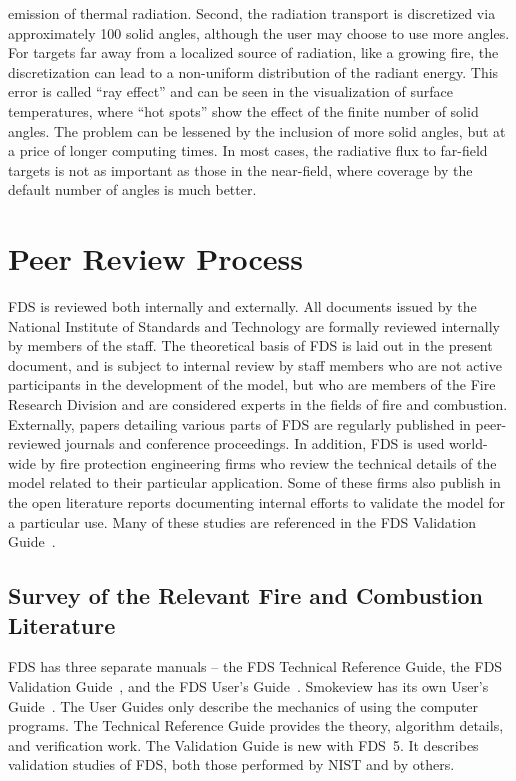 \documentclass[11pt]{book}
\begin{document}
\begin{description}
emission of thermal radiation.  Second, the radiation transport is
discretized via approximately 100 solid angles, although the user may
choose to use more angles. For targets far away from a localized
source of radiation, like a growing fire, the discretization can lead
to a non-uniform distribution of the radiant energy. This error is
called ``ray effect'' and can be seen in the visualization of surface
temperatures, where ``hot spots'' show the effect of the finite number
of solid angles. The problem can be lessened by the inclusion of more
solid angles, but at a price of longer computing times. In most cases,
the radiative flux to far-field targets is not as important as those
in the near-field, where coverage by the default number of angles is
much better.
\end{description}



\clearpage
\section{Peer Review Process}

FDS is reviewed both internally and externally. All documents issued by the
National Institute of Standards and Technology are formally reviewed internally by members of
the staff. The theoretical basis of FDS is laid out in the present document, and is
subject to internal review by staff members who are not active participants in the development
of the model, but who are members of the Fire Research Division and are considered experts in
the fields of fire and combustion. Externally, papers detailing various parts of FDS are
regularly published in peer-reviewed journals and conference proceedings. In addition, FDS
is used world-wide by fire protection engineering firms who review the technical details of
the model related to their particular application. Some of these firms also publish in the
open literature reports documenting internal efforts to validate the model for a particular
use. Many of these studies are referenced in the FDS Validation Guide~\cite{FDS_VV_Guide_5}.


\subsection{Survey of the Relevant Fire and Combustion Literature}

\label{Relevantdocs}

FDS has three separate manuals --
the FDS Technical Reference Guide, the FDS Validation Guide~\cite{FDS_VV_Guide_5},
and the FDS User's Guide~\cite{FDS_Users_Guide_5}.
Smokeview has its own User's Guide~\cite{Smokeview_Users_Guide_5}. The User Guides only describe the mechanics of using the
computer programs. The
Technical Reference Guide provides the theory, algorithm details, and verification work. The Validation Guide is new with FDS~5.
It describes validation studies of FDS, both those performed by NIST and by others.
\end{document}
